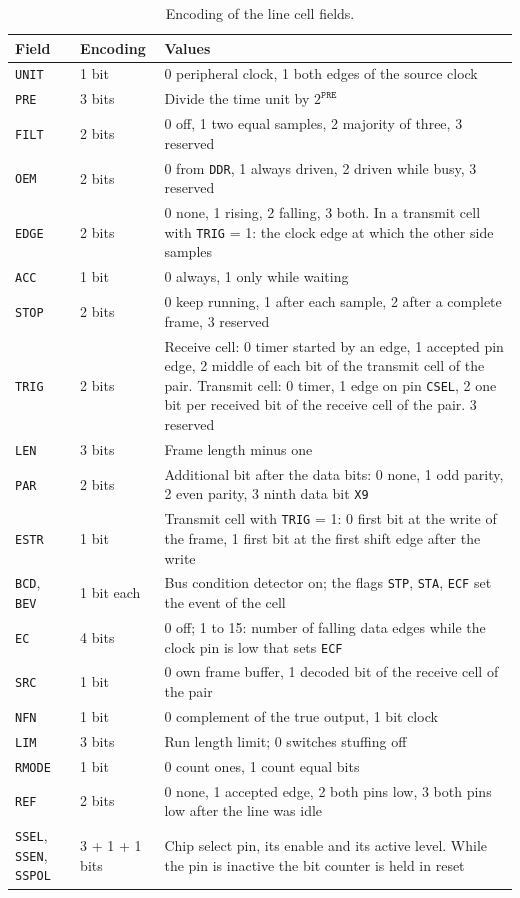 \documentclass[10pt,a4paper]{article}
\newcommand{\reg}[1]{\texttt{#1}}
\begin{document}
\begin{table}[H]
\centering\small
\begin{tabularx}{\linewidth}{@{}llL@{}}
\toprule
Field & Encoding & Values \\
\midrule
\reg{UNIT} & 1 bit & 0 peripheral clock, 1 both edges of the source clock \\
\reg{PRE} & 3 bits & Divide the time unit by $2^{\mathtt{PRE}}$ \\
\reg{FILT} & 2 bits & 0 off, 1 two equal samples, 2 majority of three, 3 reserved \\
\reg{OEM} & 2 bits & 0 from \reg{DDR}, 1 always driven, 2 driven while busy, 3 reserved \\
\reg{EDGE} & 2 bits & 0 none, 1 rising, 2 falling, 3 both. In a transmit cell with \reg{TRIG} = 1: the clock edge at which the other side samples \\
\reg{ACC} & 1 bit & 0 always, 1 only while waiting \\
\reg{STOP} & 2 bits & 0 keep running, 1 after each sample, 2 after a complete frame, 3 reserved \\
\reg{TRIG} & 2 bits & Receive cell: 0 timer started by an edge, 1 accepted pin edge, 2 middle of each bit of the transmit cell of the pair. Transmit cell: 0 timer, 1 edge on pin \reg{CSEL}, 2 one bit per received bit of the receive cell of the pair. 3 reserved \\
\reg{LEN} & 3 bits & Frame length minus one \\
\reg{PAR} & 2 bits & Additional bit after the data bits: 0 none, 1 odd parity, 2 even parity, 3 ninth data bit \reg{X9} \\
\reg{ESTR} & 1 bit & Transmit cell with \reg{TRIG} = 1: 0 first bit at the write of the frame, 1 first bit at the first shift edge after the write \\
\reg{BCD}, \reg{BEV} & 1 bit each & Bus condition detector on; the flags \reg{STP}, \reg{STA}, \reg{ECF} set the event of the cell \\
\reg{EC} & 4 bits & 0 off; 1 to 15: number of falling data edges while the clock pin is low that sets \reg{ECF} \\
\reg{SRC} & 1 bit & 0 own frame buffer, 1 decoded bit of the receive cell of the pair \\
\reg{NFN} & 1 bit & 0 complement of the true output, 1 bit clock \\
\reg{LIM} & 3 bits & Run length limit; 0 switches stuffing off \\
\reg{RMODE} & 1 bit & 0 count ones, 1 count equal bits \\
\reg{REF} & 2 bits & 0 none, 1 accepted edge, 2 both pins low, 3 both pins low after the line was idle \\
\reg{SSEL}, \reg{SSEN}, \reg{SSPOL} & 3 + 1 + 1 bits & Chip select pin, its enable and its active level. While the pin is inactive the bit counter is held in reset \\
\bottomrule
\end{tabularx}
\caption{Encoding of the line cell fields.}
\end{table}
\end{document}
